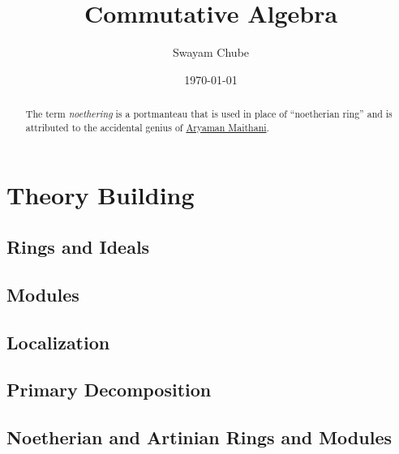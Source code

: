 \documentclass{report}
\title{Commutative Algebra}
\author{Swayam Chube}
\date{\today}
\begin{document}
\maketitle

\begin{abstract}
    The term \textit{noethering} is a portmanteau that is used in place of ``noetherian ring'' and is attributed to the accidental genius of \href{https://youtu.be/RrjJfyEF7Ak?t=1259}{Aryaman Maithani}.
\end{abstract}

\tableofcontents


\part{Theory Building}
\chapter{Rings and Ideals}


\chapter{Modules}


\chapter{Localization}


\chapter{Primary Decomposition}


\chapter{Noetherian and Artinian Rings and Modules}


% 

% 
% 
\end{document}
